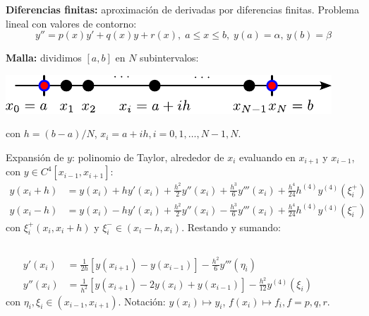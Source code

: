 \documentclass[9pt, aspectratio=169]{beamer}
\begin{document}
\begin{frame}  %
\textbf{Diferencias finitas:} aproximación de derivadas por diferencias finitas. Problema lineal con valores de contorno:
\begin{equation} y'' = p(x) y' + q(x) y + r(x), \; a \leq x \leq b, \; y(a) = \alpha, \, y(b) = \beta \label{eq:plineal} \end{equation} \pause
\vspace{-1.0em}

\textbf{Malla:} dividimos $[a, b]$ en $N$ subintervalos:
\begin{center}
    \includegraphics[scale=1.0]{figs/grilla-1d.pdf}
\end{center}
con $h = (b-a)/N$, $x_i = a + ih, i = 0, 1, \ldots, N-1, N$. \pause

Expansión de $y$: polinomio de Taylor, alrededor de $x_i$ evaluando en $x_{i+1}$ y $x_{i-1}$, con $y \in C^4[x_{i-1}, x_{i+1}]$:
\begin{align*}
    y(x_i+h) &= y(x_i) + h y'(x_i) + \frac{h^2}{2} y''(x_i) + \frac{h^3}{6} y'''(x_i) + \frac{h^4}{24} h^{(4)} y^{(4)}(\xi_i^+) \\
    y(x_i-h) &= y(x_i) - h y'(x_i) + \frac{h^2}{2} y''(x_i) - \frac{h^3}{6} y'''(x_i) + \frac{h^4}{24} h^{(4)} y^{(4)}(\xi_i^-) 
\end{align*}
con $\xi_i^+ (x_i, x_i+h)$ y $\xi_i^- \in (x_i - h, x_i)$. Restando y sumando: \vspace{-0.5em}
\begin{columns}
\begin{equation}
    \begin{split}
    y'(x_i) &=\frac{1}{2h} [y(x_{i+1}) - y(x_{i-1})] - \frac{h^2}{6} y'''(\eta_i) \\
y''(x_i) &= \frac{1}{h^2} [ y(x_{i+1}) - 2 y(x_i) + y(x_{i-1})] - \frac{h^2}{12} y^{(4)}(\xi_i)
\end{split}
\label{eq:diffin}
\end{equation}
con $\eta_i, \xi_i \in (x_{i-1}, x_{i+1})$. 
Notación: $y(x_i) \mapsto y_i$, $f(x_i) \mapsto f_i, f = p, q, r$.
\end{columns}
\end{frame}
\end{document}
